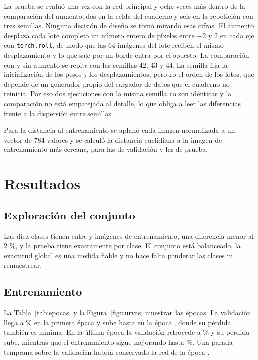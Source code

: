 \documentclass[11pt,letterpaper]{article}
\begin{document}
La prueba se evaluó una vez con la red principal y ocho veces más dentro de la comparación del aumento, dos en la celda del cuaderno y seis en la repetición con tres semillas. Ninguna decisión de diseño se tomó mirando esas cifras. El aumento desplaza cada lote completo un número entero de píxeles entre $-2$ y $2$ en cada eje con \texttt{torch.roll}, de modo que las 64 imágenes del lote reciben el mismo desplazamiento y lo que sale por un borde entra por el opuesto. La comparación con y sin aumento se repite con las semillas 42, 43 y 44. La semilla fija la inicialización de los pesos y los desplazamientos, pero no el orden de los lotes, que depende de un generador propio del cargador de datos que el cuaderno no reinicia. Por eso dos ejecuciones con la misma semilla no son idénticas y la comparación no está emparejada al detalle, lo que obliga a leer las diferencias frente a la dispersión entre semillas.

Para la distancia al entrenamiento se aplanó cada imagen normalizada a un vector de 784 valores y se calculó la distancia euclidiana a la imagen de entrenamiento más cercana, para las \nVal{} de validación y las \nTe{} de prueba.

\section{Resultados}

\subsection{Exploración del conjunto}

Las diez clases tienen entre \conteoMin{} y \conteoMax{} imágenes de entrenamiento, una diferencia menor al 2 \%, y la prueba tiene exactamente \conteoTe{} por clase. El conjunto está balanceado, la exactitud global es una medida fiable y no hace falta ponderar las clases ni remuestrear.

\subsection{Entrenamiento}

La Tabla~\ref{tab:epocas} y la Figura~\ref{fig:curvas} muestran las \epocas{} épocas. La validación llega a \vaccA{} \% en la primera época y sube hasta \vaccMax{} en la época \epVaccMax, donde su pérdida también es mínima. En la última época la validación retrocede a \vaccZ{} \% y su pérdida sube, mientras que el entrenamiento sigue mejorando hasta \accZ{} \%. Una parada temprana sobre la validación habría conservado la red de la época \epVaccMax.
\end{document}
